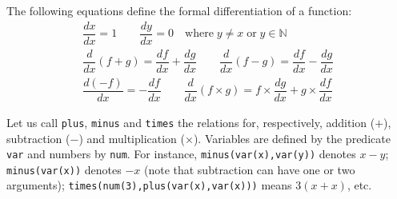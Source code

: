 \documentclass[11pt,a4paper]{article}
\author{Christian Rinderknecht}
\date{12 October 2006}
\begin{document}
\maketitle
\thispagestyle{empty}

\noindent The following equations define the formal differentiation of
a function:
\begin{gather*}
\dfrac{dx}{dx}    = 1 \qquad
\dfrac{dy}{dx}    = 0 \quad \text{where} \;y \neq x\; \text{or}\;
                            y \in\mathbb{N}\\
\dfrac{d}{dx}(f + g) = \dfrac{df}{dx} + \dfrac{dg}{dx}
\qquad
\dfrac{d}{dx}(f - g) = \dfrac{df}{dx} - \dfrac{dg}{dx}\\
\dfrac{d(-f)}{dx} = -{\dfrac{df}{dx}}
\qquad
\dfrac{d}{dx}(f \times g) = f \times {\dfrac{dg}{dx}} +
g \times {\dfrac{df}{dx}} 
\end{gather*}

\noindent Let us call \texttt{plus}, \texttt{minus} and \texttt{times}
the relations for, respectively, addition (\(+\)), subtraction
(\(-\)) and multiplication (\(\times\)). Variables are defined by the
predicate \texttt{var} and numbers by \texttt{num}. For instance,
\texttt{minus(var(x),var(y))} denotes \(x-y\); \texttt{minus(var(x))}
denotes \(-x\) (note that subtraction can have one or two arguments);
\texttt{times(num(3),plus(var(x),var(x)))} means \(3(x + x)\), etc.



\end{document}

